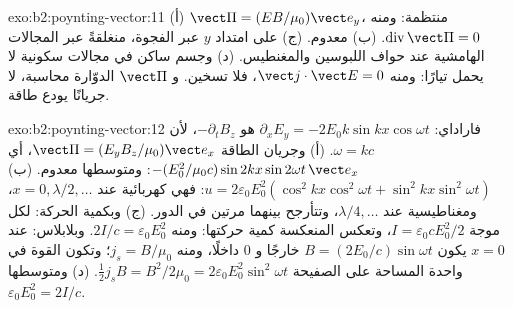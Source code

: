\begin{solution}{exo:b2:poynting-vector:11}
(أ) $\vect\Pi = (EB/\mu_0)\vect e_y$، منتظمة: ومنه $\operatorname{div}\vect\Pi = 0$. (ب) معدوم.
(ج) على امتداد $y$ عبر الفجوة، منغلقةً عبر المجالات الهامشية عند
حواف اللبوسين والمغنطيس. (د) وجسم ساكن في مجالات
سكونية لا يحمل تيارًا: ومنه $\vect j\cdot\vect E = 0$، فلا تسخين. و $\vect\Pi$
الدوّارة محاسبة، لا جريانًا يودع طاقة.
\end{solution}

\begin{solution}{exo:b2:poynting-vector:12}
فاراداي: $\partial_xE_y = -2E_0k\sin kx\cos\omega t$ هو $-\partial_tB_z$، لأن
$\omega = kc$. (أ)
وجريان الطاقة $\vect\Pi = (E_yB_z/\mu_0)\vect e_x$، أي $-(E_0^2/\mu_0c)\sin2kx\sin2\omega t\,\vect e_x$: ومتوسطها
معدوم. (ب) $u = 2\varepsilon_0E_0^2(\cos^2kx\cos^2\omega t + \sin^2kx\sin^2\omega t)$: فهي كهربائية
عند $x = 0, \lambda/2, \dots$، ومغناطيسية عند $\lambda/4, \dots$، وتتأرجح بينهما
مرتين في الدور. (ج) وبكمية الحركة: لكل موجة $I = \varepsilon_0cE_0^2/2$، وتعكس
المنعكسة كمية حركتها: ومنه $2I/c = \varepsilon_0E_0^2$. وبلابلاس: عند $x =
0$ يكون $B = (2E_0/c)\sin\omega t$ خارجًا و $0$ داخلًا،
ومنه $j_s = B/\mu_0$؛ وتكون القوة في واحدة المساحة على الصفيحة $\tfrac12j_sB = B^2/2\mu_0 = 2\varepsilon_0E_0^2\sin^2
\omega t$. (د) ومتوسطها $\varepsilon_0E_0^2 = 2I/c$.
\end{solution}

